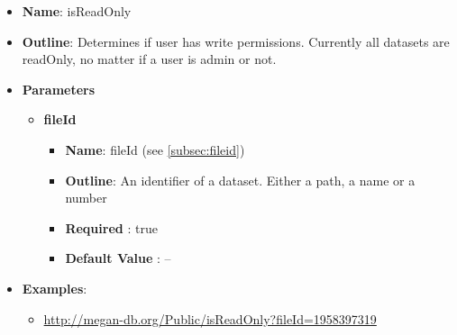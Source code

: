 \documentclass[11pt]{article}
\begin{document}
\begin{itemize}
	\item \textbf{Name}: isReadOnly
	\item \textbf{Outline}: Determines if user has write permissions. Currently all datasets are readOnly, no matter if a user is admin or not.
	\item \textbf{Parameters}
		\begin{itemize}
			\item \textbf{fileId}
				\begin{itemize}
					\item \textbf{Name}: fileId (see \ref{subsec:fileid})
					\item \textbf{Outline}: An identifier of a dataset. Either a path, a name or a number
					\item \textbf{Required} : true
					\item \textbf{Default Value} : --
				\end{itemize}
		\end{itemize}
	\item \textbf{Examples}:
		\begin{itemize}
			\item \url{http://megan-db.org/Public/isReadOnly?fileId=1958397319}
		\end{itemize}
\end{itemize}
\end{document}
